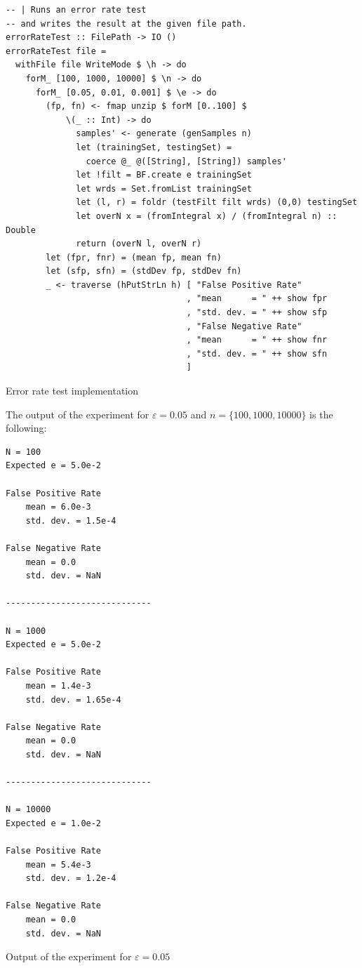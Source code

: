 \documentclass[12pt, a4paper]{article} %
\begin{document}
\begin{listing}[H]
  \begin{verbatim}
-- | Runs an error rate test
-- and writes the result at the given file path.
errorRateTest :: FilePath -> IO ()
errorRateTest file =
  withFile file WriteMode $ \h -> do
    forM_ [100, 1000, 10000] $ \n -> do
      forM_ [0.05, 0.01, 0.001] $ \e -> do
        (fp, fn) <- fmap unzip $ forM [0..100] $
            \(_ :: Int) -> do
              samples' <- generate (genSamples n)
              let (trainingSet, testingSet) =
                coerce @_ @([String], [String]) samples'
              let !filt = BF.create e trainingSet
              let wrds = Set.fromList trainingSet
              let (l, r) = foldr (testFilt filt wrds) (0,0) testingSet
              let overN x = (fromIntegral x) / (fromIntegral n) :: Double
              return (overN l, overN r)
        let (fpr, fnr) = (mean fp, mean fn)
        let (sfp, sfn) = (stdDev fp, stdDev fn)
        _ <- traverse (hPutStrLn h) [ "False Positive Rate"
                                    , "mean      = " ++ show fpr
                                    , "std. dev. = " ++ show sfp
                                    , "False Negative Rate"
                                    , "mean      = " ++ show fnr
                                    , "std. dev. = " ++ show sfn
                                    ]
  \end{verbatim}
  \caption{Error rate test implementation}
  \label{lst:error-rate-test}
\end{listing}

\newpage

The output of the experiment for $\varepsilon = 0.05$ and $n = \{100, 1000, 10000\}$ is the following:

\begin{listing}[H]
  \begin{verbatim}
N = 100
Expected e = 5.0e-2

False Positive Rate
	mean = 6.0e-3
	std. dev. = 1.5e-4

False Negative Rate
	mean = 0.0
	std. dev. = NaN

-----------------------------

N = 1000
Expected e = 5.0e-2

False Positive Rate
	mean = 1.4e-3
	std. dev. = 1.65e-4

False Negative Rate
	mean = 0.0
	std. dev. = NaN

-----------------------------

N = 10000
Expected e = 1.0e-2

False Positive Rate
	mean = 5.4e-3
	std. dev. = 1.2e-4

False Negative Rate
	mean = 0.0
	std. dev. = NaN
  \end{verbatim}
  \caption{Output of the experiment for $\varepsilon = 0.05$}
  \label{lst:test-output}
\end{listing}
\end{document}
